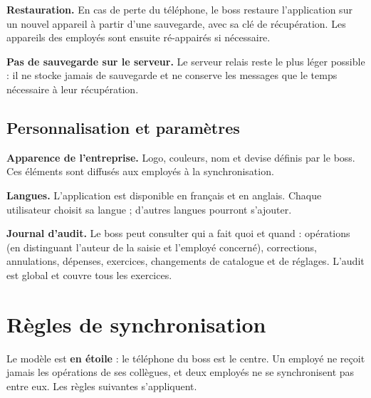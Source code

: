 \documentclass[11pt,a4paper]{article}
\newcommand{\fonc}[2]{\textbf{#1.} #2\par\vspace{0.2em}}
\begin{document}
	\fonc{Restauration}{En cas de perte du téléphone, le boss restaure l'application sur un nouvel appareil à partir d'une sauvegarde, avec sa clé de récupération. Les appareils des employés sont ensuite ré-appairés si nécessaire.}
	
	\fonc{Pas de sauvegarde sur le serveur}{Le serveur relais reste le plus léger possible : il ne stocke jamais de sauvegarde et ne conserve les messages que le temps nécessaire à leur récupération.}
	
	\subsection{Personnalisation et paramètres}
	
	\fonc{Apparence de l'entreprise}{Logo, couleurs, nom et devise définis par le boss. Ces éléments sont diffusés aux employés à la synchronisation.}
	
	\fonc{Langues}{L'application est disponible en français et en anglais. Chaque utilisateur choisit sa langue ; d'autres langues pourront s'ajouter.}
	
	\fonc{Journal d'audit}{Le boss peut consulter qui a fait quoi et quand : opérations (en distinguant l'auteur de la saisie et l'employé concerné), corrections, annulations, dépenses, exercices, changements de catalogue et de réglages. L'audit est global et couvre tous les exercices.}
	
	\section{Règles de synchronisation}
	Le modèle est \textbf{en étoile} : le téléphone du boss est le centre. Un employé ne reçoit jamais les opérations de ses collègues, et deux employés ne se synchronisent pas entre eux. Les règles suivantes s'appliquent.
	
\end{document}
